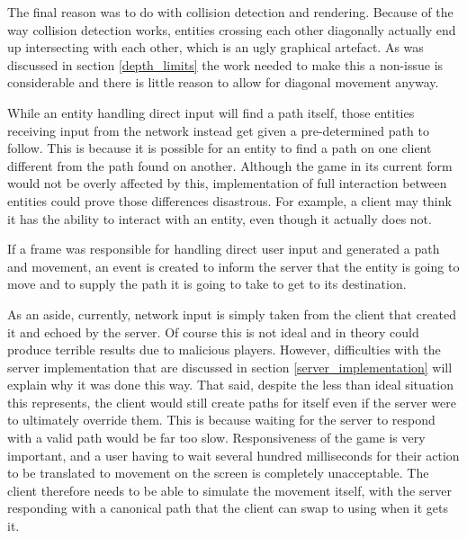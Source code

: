 
The final reason was to do with collision detection and rendering. Because of the way collision detection works, entities crossing each other diagonally actually end up intersecting with each other, which is an ugly graphical artefact. As was discussed in section \ref{depth_limits} the work needed to make this a non-issue is considerable and there is little reason to allow for diagonal movement anyway.


While an entity handling direct input will find a path itself, those entities receiving input from the network instead get given a pre-determined path to follow. This is because it is possible for an entity to find a path on one client different from the path found on another. Although the game in its current form would not be overly affected by this, implementation of full interaction between entities could prove those differences disastrous. For example, a client may think it has the ability to interact with an entity, even though it actually does not.


If a frame was responsible for handling direct user input and generated a path and movement, an event is created to inform the server that the entity is going to move and to supply the path it is going to take to get to its destination.

As an aside, currently, network input is simply taken from the client that created it and echoed by the server. Of course this is not ideal and in theory could produce terrible results due to malicious players. However, difficulties with the server implementation that are discussed in section \ref{server_implementation} will explain why it was done this way. That said, despite the less than ideal situation this represents, the client would still create paths for itself even if the server were to ultimately override them. This is because waiting for the server to respond with a valid path would be far too slow. Responsiveness of the game is very important, and a user having to wait several hundred milliseconds for their action to be translated to movement on the screen is completely unacceptable. The client therefore needs to be able to simulate the movement itself, with the server responding with a canonical path that the client can swap to using when it gets it.

